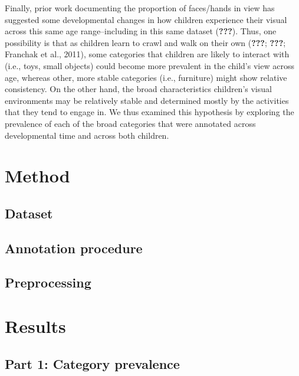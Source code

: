 \documentclass[10pt, letterpaper]{article}
\begin{document}
Finally, prior work documenting the proportion of faces/hands in view
has suggested some developmental changes in how children experience
their visual across this same age range--including in this same dataset
({\textbf{???}}). Thus, one possibility is that as children learn to
crawl and walk on their own ({\textbf{???}}; {\textbf{???}}; Franchak et
al., 2011), some categories that children are likely to interact with
(i.e., toys, small objects) could become more prevalent in the child's
view across age, whereas other, more stable categories (i.e., furniture)
might show relative consistency. On the other hand, the broad
characteristics children's visual environments may be relatively stable
and determined mostly by the activities that they tend to engage in. We
thus examined this hypothesis by exploring the prevalence of each of the
broad categories that were annotated across developmental time and
across both children.

\hypertarget{method}{%
\section{Method}\label{method}}

\hypertarget{dataset}{%
\subsection{Dataset}\label{dataset}}

\hypertarget{annotation-procedure}{%
\subsection{Annotation procedure}\label{annotation-procedure}}

\hypertarget{preprocessing}{%
\subsection{Preprocessing}\label{preprocessing}}

\hypertarget{results}{%
\section{Results}\label{results}}

\hypertarget{part-1-category-prevalence}{%
\subsection{Part 1: Category
prevalence}\label{part-1-category-prevalence}}
\end{document}
